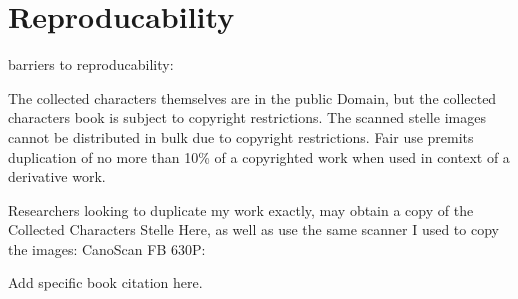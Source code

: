 \chapter{Reproducability}


barriers to reproducability:

The collected characters themselves are in the public Domain, but the collected characters book is subject to copyright restrictions.  The scanned stelle images cannot be distributed in bulk due to copyright restrictions.  Fair use premits duplication of no more than 10\% of a copyrighted work when used in context of a derivative work.  

Researchers looking to duplicate my work exactly, may obtain a copy of the Collected Characters Stelle Here, as well as use the same scanner I used to copy the images:  CanoScan FB 630P:

Add specific book citation here.




